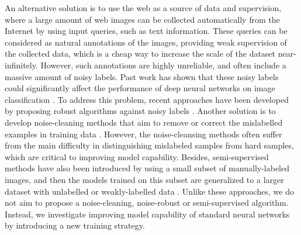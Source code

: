 \documentclass[runningheads]{llncs}
\begin{document}
An alternative solution is to use the web as a source of data and supervision, where a large amount of web images can be collected automatically from the Internet by using input queries, such as text information.
These queries can be considered as natural annotations of the images, providing weak supervision of the collected data, which is a cheap way to increase the scale of the dataset near-infinitely. However, such annotations are highly unreliable, and often include a massive amount of noisy labels. Past work has shown that these noisy labels could significantly affect the performance of deep neural networks on image classification \cite{xiao2015learning}. To address this problem, recent approaches have been developed by proposing robust algorithms against noisy labels \cite{rolnick2017deep}. Another solution is to develop noise-cleaning methods that aim to remove or correct the mislabelled examples in training data \cite{sukhbaatar2014learning}. However, the noise-cleansing methods often suffer from the main difficulty in distinguishing mislabeled samples from hard samples, which are critical to improving model capability. Besides, semi-supervised methods have also been introduced by using a small subset of manually-labeled images, and then the models trained on this subset are generalized to a larger dataset with unlabelled or weakly-labelled data \cite{Veit2017}.  Unlike these approaches, we do not aim to propose a noise-cleaning, noise-robust or semi-supervised algorithm. Instead, we investigate improving model capability of standard neural networks by introducing a new training strategy.
\end{document}
